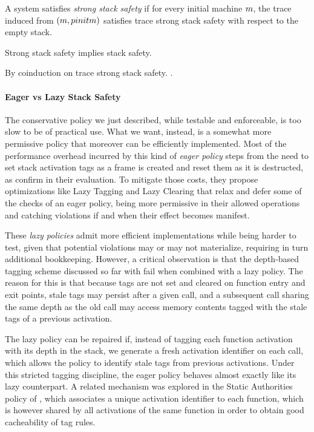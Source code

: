 \documentclass[acmsmall,review,anonymous]{acmart}\settopmatter{printfolios=true,printccs=false,printacmref=false}
\begin{document}
%
A system satisfies {\em strong stack safety} if for every initial machine $m$,
the trace induced from $(m, pinit{m})$ satisfies trace strong stack safety with
respect to the empty stack.

\theorem
Strong stack safety implies stack safety.

\proof
By coinduction on trace strong stack safety.
.

\paragraph*{Eager vs Lazy Stack Safety}

The conservative policy we just described, while testable and enforceable, is
too slow to be of practical use. What we want, instead, is a somewhat more
permissive policy that moreover can be efficiently implemented. Most of the
performance overhead incurred by this kind of \emph{eager policy} steps from the
need to set stack activation tags as a frame is created and reset them as it is
destructed, as \citet{DBLP:conf/sp/RoesslerD18} confirm in their evaluation. To
mitigate those costs, they propose optimizations like Lazy Tagging and Lazy
Clearing that relax and defer some of the checks of an eager policy, being more
permissive in their allowed operations and catching violations if and when their
effect becomes manifest.

These \emph{lazy policies} admit more efficient implementations while being
harder to test, given that potential violations may or may not materialize,
requiring in turn additional bookkeeping. However, a critical observation is
that the depth-based tagging scheme discussed so far with fail when combined
with a lazy policy. The reason for this is that because tags are not set and
cleared on function entry and exit points, stale tags may persist after a given
call, and a subsequent call sharing the same depth as the old call may access
memory contents tagged with the stale tags of a previous activation.

The lazy policy can be repaired if, instead of tagging each function activation
with its depth in the stack, we generate a fresh activation identifier on each
call, which allows the policy to identify stale tags from previous activations.
Under this stricted tagging discipline, the eager policy behaves almost exactly
like its lazy counterpart. A related mechanism was explored in the Static
Authorities policy of \citet{DBLP:conf/sp/RoesslerD18}, which associates a
unique activation identifier to each function, which is however shared by all
activations of the same function in order to obtain good cacheability of tag
rules.
\end{document}
